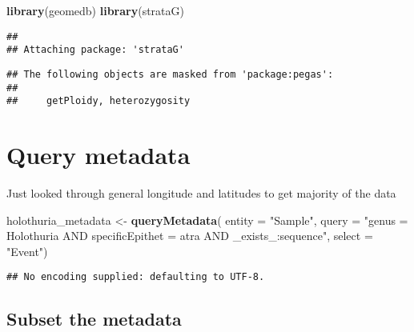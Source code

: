 \documentclass[
]{article}
\newenvironment{Shaded}{\begin{snugshade}}{\end{snugshade}}
\newcommand{\DataTypeTok}[1]{\textcolor[rgb]{0.13,0.29,0.53}{#1}}
\newcommand{\KeywordTok}[1]{\textcolor[rgb]{0.13,0.29,0.53}{\textbf{#1}}}
\newcommand{\NormalTok}[1]{#1}
\newcommand{\OperatorTok}[1]{\textcolor[rgb]{0.81,0.36,0.00}{\textbf{#1}}}
\newcommand{\StringTok}[1]{\textcolor[rgb]{0.31,0.60,0.02}{#1}}
\begin{document}
\begin{Shaded}
\begin{Highlighting}[]
\KeywordTok{library}\NormalTok{(geomedb)}
\KeywordTok{library}\NormalTok{(strataG)}
\end{Highlighting}
\end{Shaded}

\begin{verbatim}
## 
## Attaching package: 'strataG'
\end{verbatim}

\begin{verbatim}
## The following objects are masked from 'package:pegas':
## 
##     getPloidy, heterozygosity
\end{verbatim}

\hypertarget{query-metadata}{%
\section{Query metadata}\label{query-metadata}}

Just looked through general longitude and latitudes to get majority of
the data

\begin{Shaded}
\begin{Highlighting}[]
\NormalTok{holothuria_metadata <-}\StringTok{ }\KeywordTok{queryMetadata}\NormalTok{(}
  \DataTypeTok{entity =} \StringTok{"Sample"}\NormalTok{,}
  \DataTypeTok{query =} \StringTok{"genus = Holothuria AND specificEpithet = atra AND _exists_:sequence"}\NormalTok{,}
  \DataTypeTok{select =} \StringTok{"Event"}\NormalTok{)}
\end{Highlighting}
\end{Shaded}

\begin{verbatim}
## No encoding supplied: defaulting to UTF-8.
\end{verbatim}

\begin{Shaded}
\end{Shaded}

\hypertarget{subset-the-metadata}{%
\subsection{Subset the metadata}\label{subset-the-metadata}}
\end{document}
